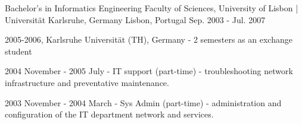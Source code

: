 \begin{cventries}

  \cventry
    {Bachelor's in Informatics Engineering} %
	{Faculty of Sciences, University of Lisbon | Universität Karlsruhe, Germany} %
    {Lisbon, Portugal} %
    {Sep. 2003 - Jul. 2007} %
    {
      \begin{cvitems} %
        \item {2005-2006, Karlsruhe Universität (TH), Germany - 2 semesters as an exchange student}
		\item {2004 November - 2005 July - IT support (part-time) - troubleshooting network infrastructure and preventative maintenance.}
		\item {2003 November - 2004 March - Sys Admin (part-time) - administration and configuration of the IT department network and services.}
      \end{cvitems}
    }

	
	

\end{cventries}
